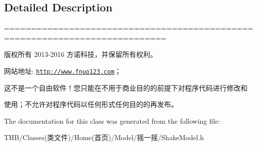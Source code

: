 \subsection{Detailed Description}
============================================================================

版权所有 2013-\/2016 方诺科技，并保留所有权利。

网站地址\+: \href{http://www.fnuo123.com}{\tt http\+://www.\+fnuo123.\+com}； 



这不是一个自由软件！您只能在不用于商业目的的前提下对程序代码进行修改和

使用；不允许对程序代码以任何形式任何目的的再发布。 

 

The documentation for this class was generated from the following file\+:\begin{DoxyCompactItemize}
\item 
T\+H\+B/\+Classes(类文件)/\+Home(首页)/\+Model/摇一摇/Shake\+Model.\+h\end{DoxyCompactItemize}
